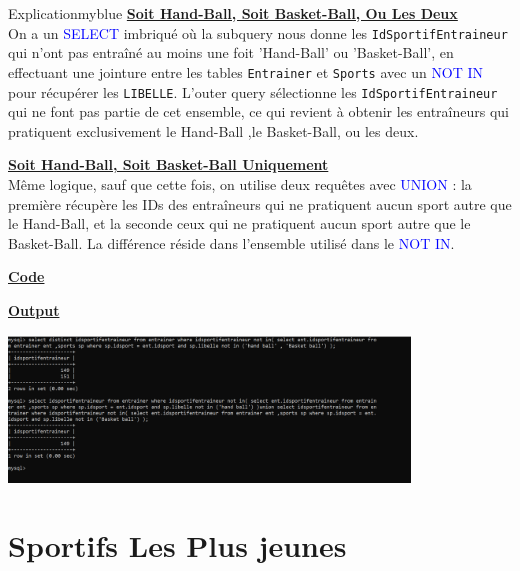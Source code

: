 \begin{prettyBox}{Explication}{myblue}
\textbf{\underline{Soit Hand-Ball, Soit Basket-Ball, Ou Les Deux}} \\[0.15cm]
On a un \textcolor{blue}{SELECT} imbriqué où la subquery nous donne les \texttt{IdSportifEntraineur}
qui n'ont pas entraîné au moins une foit 'Hand-Ball' ou 'Basket-Ball',  
en effectuant une jointure entre les tables \texttt{Entrainer} et \texttt{Sports} avec
un \textcolor{blue}{NOT IN} pour récupérer les \texttt{LIBELLE}.  
L'outer query sélectionne les \texttt{IdSportifEntraineur} qui ne font pas partie de cet ensemble,  
ce qui revient à obtenir les entraîneurs qui pratiquent exclusivement le Hand-Ball ,le Basket-Ball, ou les deux.
\vspace{0.25cm}

\textbf{\underline{Soit Hand-Ball, Soit Basket-Ball Uniquement}} \\[0.15cm]
Même logique, sauf que cette fois, on utilise deux requêtes avec \textcolor{blue}{UNION} :  
la première récupère les IDs des entraîneurs qui ne pratiquent aucun sport autre que le Hand-Ball,  
et la seconde ceux qui ne pratiquent aucun sport autre que le Basket-Ball.  
La différence réside dans l'ensemble utilisé dans le \textcolor{blue}{NOT IN}.
\end{prettyBox}
\vspace{0.5cm}
\textbf{\underline{Code}}


\vspace{0.5cm}
\textbf{\underline{Output}}

\vspace{0.25cm}
\begin{center}
    \includegraphics[width=0.8\textwidth]{Parties/Partie3/ent.PNG}
\end{center}

\newpage

\section{Sportifs Les Plus jeunes}

